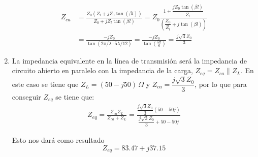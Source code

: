\documentclass[
  11pt,
  letterpaper,
   addpoints,
   answers
  ]{exam}
\begin{document}
\begin{questions}
\begin{solution}
\begin{enumerate}
    \begin{align}
        Z_{ca} &= \frac{Z_0 (Z_l + j Z_0 \tan(\beta l))}{Z_0 + j Z_l \tan(\beta l)} 
        = Z_0 \frac{1 + \dfrac{j Z_0 \tan(\beta l)}{Z_l}}{\left( \dfrac{Z_0}{Z_l} + j \tan(\beta l) \right)} \tag{89} \\
        &= \frac{ -j Z_0 }{ \tan \left( 2\pi/\lambda \cdot 5\lambda/12 \right) }
        = \frac{ -j Z_0 }{ \tan \left( \frac{5\pi}{6} \right) }
        = \frac{ j \sqrt{3} Z_0 }{3 } \tag{90}
    \end{align}

    \item La impedancia equivalente en la línea de transmisión será la impedancia de circuito abierto en paralelo con la impedancia de la carga, $Z_{eq} = Z_{ca} \parallel Z_L$. En este caso se tiene que $Z_L = (50 - j50)\,\Omega$ y $Z_{ca} = \dfrac{j\sqrt{3}Z_0}{3}$, por lo que para conseguir $Z_{eq}$ se tiene que:
    \begin{align}
        Z_{eq} = \frac{Z_{ca} Z_L}{Z_{ca} + Z_L}
        = \frac{ \dfrac{j\sqrt{3}Z_0}{3}(50 - 50j) }{ \dfrac{j\sqrt{3}Z_0}{3} + 50 - 50j } \tag{91}
    \end{align}

    Esto nos dará como resultado
    \begin{equation}
        Z_{eq} = 83.47 + j37.15 \tag{92}
    \end{equation}
\end{enumerate}
\end{solution}
\end{questions}
\newpage
\end{document}
